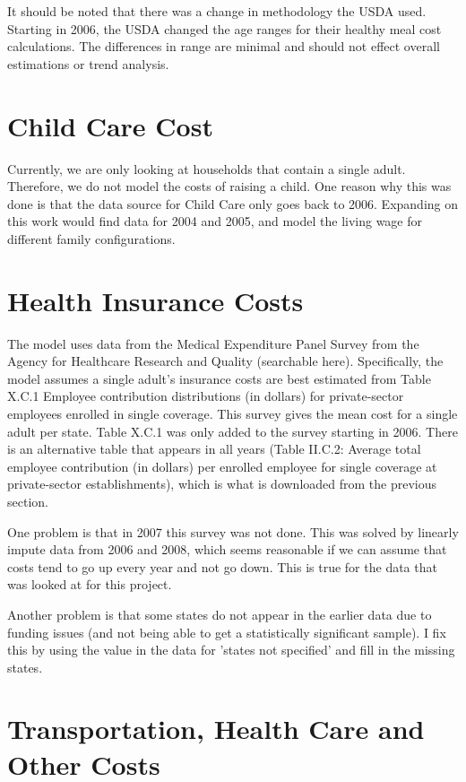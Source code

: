 It should be noted that there was a change in methodology the USDA used. Starting in 2006, the USDA changed the age ranges for their healthy meal cost calculations. The differences in range are minimal and should not effect overall estimations or trend analysis.

\section{Child Care Cost}

Currently, we are only looking at households that contain a single adult. Therefore, we do not model the costs of raising a child. One reason why this was done is that the data source for Child Care only goes back to 2006. Expanding on this work would find data for 2004 and 2005, and model the living wage for different family configurations.

\section{Health Insurance Costs}

The model uses data from the Medical Expenditure Panel Survey from the Agency for Healthcare Research and Quality (searchable here). Specifically, the model assumes a single adult's insurance costs are best estimated from Table X.C.1 Employee contribution distributions (in dollars) for private-sector employees enrolled in single coverage. This survey gives the mean cost for a single adult per state. Table X.C.1 was only added to the survey starting in 2006. There is an alternative table that appears in all years (Table II.C.2: Average total employee contribution (in dollars) per enrolled employee for single coverage at private-sector establishments), which is what is downloaded from the previous section.

One problem is that in 2007 this survey was not done. This was solved by linearly impute data from 2006 and 2008, which seems reasonable if we can assume that costs tend to go up every year and not go down. This is true for the data that was looked at for this project.

Another problem is that some states do not appear in the earlier data due to funding issues (and not being able to get a statistically significant sample). I fix this by using the value in the data for 'states not specified' and fill in the missing states.


\section{Transportation, Health Care and Other Costs}

